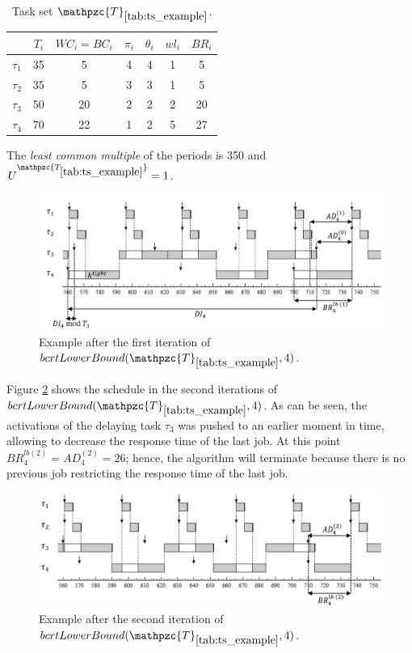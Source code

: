 \documentclass[fleqn]{article}
\begin{document}
\begin{table}[H]
	\center
	\caption{Task set $\mathpzc{T}_{\ref{tab:ts_example}}$.}
	\label{tab:ts_example}
	\begin{tabular}{c c c c c | c c}
		\hline 
		& $T_i$ & $WC_i=BC_i$ & $\pi_i$ & $\theta_i$ &  $wl_i$ & $BR_i$\\ 
		\hline 
		$\tau_1$& 35 & 5  & 4 & 4 &  1 & 5\\ 
		$\tau_2$& 35 & 5  & 3 & 3 &  1 & 5\\ 
		$\tau_3$& 50 & 20 & 2 & 2 &  2 & 20\\ 
		$\tau_4$& 70 & 22 & 1 & 2 &  5 & 27\\
		\hline 
	\end{tabular}
	\small
	\item The \textit{least common multiple} of the periods is 350 and $U^{\mathpzc{T_{\ref{tab:ts_example}}}}=1$.
\end{table}

\begin{figure}[H]
	\centering
	\includegraphics[width=1\linewidth]{figures/bcrt_lb_ex1.PNG}
	\caption{Example after the first iteration of $bcrtLowerBound(\mathpzc{T}_{\ref{tab:ts_example}},4)$. }
	\label{fig:bcrt_lb_ex1}
\end{figure}

Figure \ref{fig:bcrt_lb_ex2} shows the schedule in the second iterations of $bcrtLowerBound(\mathpzc{T}_{\ref{tab:ts_example}},4)$. As can be seen, the activations of the delaying task $\tau_3$ was pushed to an earlier moment in time, allowing to decrease the response time of the last job. At this point $BR^{lb(2)}_4 = AD^{(2)}_4 = 26$; hence, the algorithm will terminate because there is no previous job restricting the response time of the last job.

\begin{figure}[H]
	\centering
	\includegraphics[width=1\linewidth]{figures/bcrt_lb_ex2.PNG}
	\caption{Example after the second iteration of $bcrtLowerBound(\mathpzc{T}_{\ref{tab:ts_example}},4)$. }
	\label{fig:bcrt_lb_ex2}
\end{figure}
\end{document}
